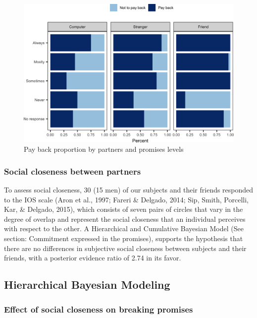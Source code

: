 \documentclass[12pt,]{article}
\begin{document}
\begin{figure}

{\centering \includegraphics[width=0.8\linewidth]{article_english_files/figure-latex/fig2-1} 

}

\caption{Pay back proportion by partners and promises levels}\label{fig:fig2}
\end{figure}

\hypertarget{social-closeness-between-partners}{%
\subsubsection{Social closeness between
partners}\label{social-closeness-between-partners}}

To assess social closeness, 30 (15 men) of our subjects and their
friends responded to the IOS scale (Aron et al., 1997; Fareri \&
Delgado, 2014; Sip, Smith, Porcelli, Kar, \& Delgado, 2015), which
consists of seven pairs of circles that vary in the degree of overlap
and represent the social closeness that an individual perceives with
respect to the other. A Hierarchical and Cumulative Bayesian Model (See
section: Commitment expressed in the promises), supports the hypothesis
that there are no differences in subjective social closeness between
subjects and their friends, with a posterior evidence ratio of 2.74 in
its favor.

\hypertarget{hierarchical-bayesian-modeling}{%
\subsection{Hierarchical Bayesian
Modeling}\label{hierarchical-bayesian-modeling}}

\hypertarget{effect-of-social-closeness-on-breaking-promises}{%
\subsubsection{Effect of social closeness on breaking
promises}\label{effect-of-social-closeness-on-breaking-promises}}
\end{document}
